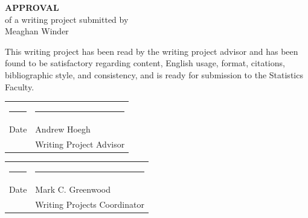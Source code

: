 \documentclass[12pt]{article}\usepackage[]{graphicx}\usepackage[]{color}
\begin{document}
\begin{titlepage}
\null
\begin{center}
{\bf\huge APPROVAL}\\[1.0 in]
of a writing project submitted by\\[.25 in]
Meaghan Winder \\[0.5 in]
\end{center}

\noindent
This writing project has been read by the writing project advisor and
has been found to be satisfactory regarding content, English usage,
format, citations, bibliographic style, and consistency, and is ready
for submission to the Statistics Faculty.

\vspace{.3in}
\begin{center}
\begin{tabular}{ll}
\rule{2.75in}{.03in} & \rule{2.75in}{.03in} \\
Date& Andrew Hoegh \\
& Writing Project Advisor \\
\end{tabular}
\end{center}

\vspace{1cm}

\begin{center}
\begin{tabular}{ll}
\rule{2.75in}{.03in} & \rule{2.75in}{.03in} \\
Date& Mark C. Greenwood \\
& Writing Projects Coordinator \\
\end{tabular}
\end{center}

\end{titlepage}

\newpage
\tableofcontents
\newpage
\end{document}
